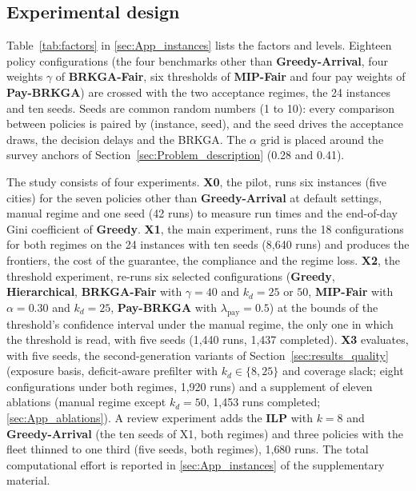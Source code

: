 \documentclass[a4paper,11pt,review,3p,authoryear]{elsarticle}
\begin{document}
\subsection{Experimental design}
\label{sec:design}

Table~\ref{tab:factors} in \ref{sec:App_instances} lists the factors and levels. Eighteen policy configurations (the four benchmarks other than \textbf{Greedy-Arrival}, four weights $\gamma$ of \textbf{BRKGA-Fair}, six thresholds of \textbf{MIP-Fair} and four pay weights of \textbf{Pay-BRKGA}) are crossed with the two acceptance regimes, the 24 instances and ten seeds. Seeds are common random numbers (1 to 10): every comparison between policies is paired by (instance, seed), and the seed drives the acceptance draws, the decision delays and the BRKGA. The $\alpha$ grid is placed around the survey anchors of Section~\ref{sec:Problem_description} (0.28 and 0.41).

The study consists of four experiments. \textbf{X0}, the pilot, runs six instances (five cities) for the seven policies other than \textbf{Greedy-Arrival} at default settings, manual regime and one seed (42 runs) to measure run times and the end-of-day Gini coefficient of \textbf{Greedy}. \textbf{X1}, the main experiment, runs the 18 configurations for both regimes on the 24 instances with ten seeds (8{,}640 runs) and produces the frontiers, the cost of the guarantee, the compliance and the regime loss. \textbf{X2}, the threshold experiment, re-runs six selected configurations (\textbf{Greedy}, \textbf{Hierarchical}, \textbf{BRKGA-Fair} with $\gamma = 40$ and $k_d = 25$ or $50$, \textbf{MIP-Fair} with $\alpha = 0.30$ and $k_d = 25$, \textbf{Pay-BRKGA} with $\lambda_{\text{pay}} = 0.5$) at the bounds of the threshold's confidence interval under the manual regime, the only one in which the threshold is read, with five seeds (1{,}440 runs, 1{,}437 completed). \textbf{X3} evaluates, with five seeds, the second-generation variants of Section~\ref{sec:results_quality} (exposure basis, deficit-aware prefilter with $k_d \in \{8, 25\}$ and coverage slack; eight configurations under both regimes, 1{,}920 runs) and a supplement of eleven ablations (manual regime except $k_d = 50$, 1{,}453 runs completed; \ref{sec:App_ablations}). A review experiment adds the \textbf{ILP} with $k = 8$ and \textbf{Greedy-Arrival} (the ten seeds of X1, both regimes) and three policies with the fleet thinned to one third (five seeds, both regimes), 1{,}680 runs. The total computational effort is reported in \ref{sec:App_instances} of the supplementary material.
\end{document}
